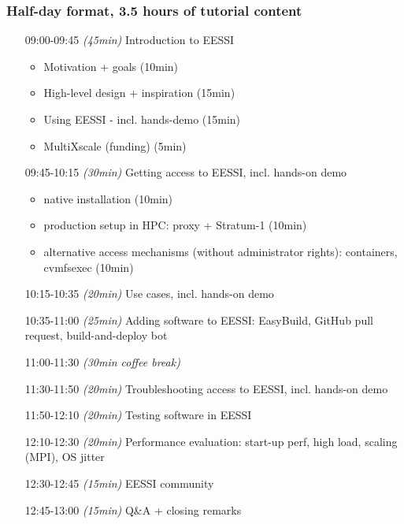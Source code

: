 \begin{itemize}[style=standard, labelwidth=1.9cm]
\end{itemize}
 

\subsubsection*{Half-day format, 3.5 hours of tutorial content}

\begin{itemize}[style=standard, labelwidth=1.9cm]


    \item [09:00-09:45] \emph{(45min)} Introduction to EESSI
    \begin{itemize}
        \item Motivation + goals (10min)
        \item High-level design + inspiration (15min)
        \item Using EESSI - incl. hands-demo (15min)
        \item MultiXscale (funding) (5min)
    \end{itemize}
    \item [09:45-10:15] \emph{(30min)} Getting access to EESSI, incl. hands-on demo
    \begin{itemize}
        \item native installation (10min)
        \item production setup in HPC: proxy + Stratum-1 (10min)
        \item alternative access mechanisms (without administrator rights): containers, cvmfsexec (10min)
    \end{itemize}
    \item [10:15-10:35] \emph{(20min)} Use cases, incl. hands-on demo
    \item [10:35-11:00] \emph{(25min)} Adding software to EESSI: EasyBuild, GitHub pull request, build-and-deploy bot
    \item [11:00-11:30] \emph{(30min coffee break)}
    \item [11:30-11:50] \emph{(20min)} Troubleshooting access to EESSI, incl. hands-on demo
    \item [11:50-12:10] \emph{(20min)} Testing software in EESSI
    \item [12:10-12:30] \emph{(20min)} Performance evaluation: start-up perf, high load, scaling (MPI), OS jitter
    \item [12:30-12:45] \emph{(15min)} EESSI community
    \item [12:45-13:00] \emph{(15min)} Q\&A + closing remarks

\end{itemize}

